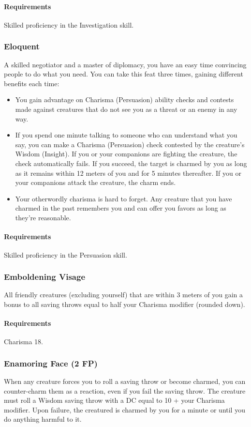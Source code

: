     \paragraph{Requirements} Skilled proficiency in the Investigation skill.
\subsubsection{Eloquent} \label{feat::eloquent}
    A skilled negotiator and a master of diplomacy, you have an easy time convincing people to do what you need.
    You can take this feat three times, gaining different benefits each time:
    \begin{itemize}
        \item You gain advantage on Charisma (Persuasion) ability checks and contests made against creatures that do not see you as a threat or an enemy in any way.
        \item If you spend one minute talking to someone who can understand what you say, you can make a Charisma (Persuasion) check contested by the creature's Wisdom (Insight).
        If you or your companions are fighting the creature, the check automatically fails.
        If you succeed, the target is charmed by you as long as it remains within 12 meters of you and for 5 minutes thereafter.
        If you or your companions attack the creature, the charm ends.
        \item Your otherwordly charisma is hard to forget.
        Any creature that you have charmed in the past remembers you and can offer you favors as long as they're reasonable.
    \end{itemize}
    \paragraph{Requirements} Skilled proficiency in the Persuasion skill.
\subsubsection{Emboldening Visage} \label{feat::emboldeningvisage}
    All friendly creatures (excluding yourself) that are within 3 meters of you gain a bonus to all saving throws equal to half your Charisma modifier (rounded down).
    \paragraph{Requirements} Charisma 18.
\subsubsection{Enamoring Face (2 FP)} \label{feat::enamoringface}
    When any creature forces you to roll a saving throw or become charmed, you can counter-charm them as a reaction, even if you fail the saving throw.
    The creature must roll a Wisdom saving throw with a DC equal to 10 + your Charisma modifier.
    Upon failure, the creatured is charmed by you for a minute or until you do anything harmful to it.
